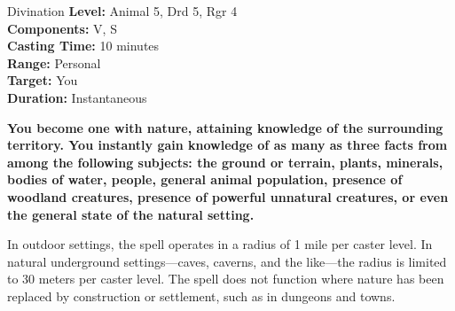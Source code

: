 {Divination}
{
	\textbf{Level:}
	Animal 5, Drd 5, Rgr 4\\
	\textbf{Components:}
	V, S\\
	\textbf{Casting Time:}
	10 minutes\\
	\textbf{Range:}
	Personal\\
	\textbf{Target:}
	You\\
	\textbf{Duration:}
	Instantaneous\\
}
{
	\textbf{	You become one with nature, attaining knowledge of the surrounding territory. You instantly gain knowledge of as many as three facts from among the following subjects: the ground or terrain, plants, minerals, bodies of water, people, general animal population, presence of woodland creatures, presence of powerful unnatural creatures, or even the general state of the natural setting.}

	In outdoor settings, the spell operates in a radius of 1 mile per caster level. In natural underground settings---caves, caverns, and the like---the radius is limited to 30 meters per caster level. The spell does not function where nature has been replaced by construction or settlement, such as in dungeons and towns.

}
